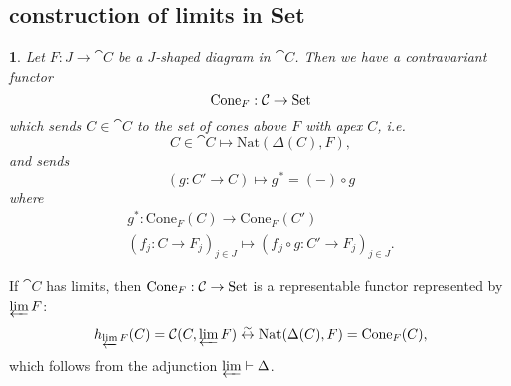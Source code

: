 \documentclass[12pt]{article}
\newtheorem{para}[theorem]{}
\begin{document}
\subsection{construction of limits in Set} %

\begin{para}
	Let $F:J\to\cat{C}$ be a $J$-shaped diagram in $\cat{C}$. Then we have a contravariant functor
	\begin{equation*}
		\text{Cone}_F:\mathcal{C}\to\text{Set}
	\end{equation*}
	which sends $C\in\cat{C}$ to the set of cones above $F$ with apex $C$, i.e.  
	\begin{equation*}
		C\in\cat{C} \mapsto \text{Nat}(\Delta(C), F),
	\end{equation*}
	and sends 
	\begin{equation*}
		(g: C'\to C) \mapsto g^\ast = (-) \circ g
	\end{equation*}
	where 
	\begin{gather*}
		g^\ast: \text{Cone}_F(C) \to \text{Cone}_F(C') \\
		(f_j: C\to F_j)_{j\in J} \mapsto (f_j\circ g: C' \to F_j)_{j\in J}.
	\end{gather*}
\end{para}

\begin{corollary}
	If $\cat{C}$ has limits, then $\text{Cone}_F:\mathcal{C}\to\text{Set}$ is a representable functor represented by $\varprojlim F$:
	\begin{equation*}
		h_{\varprojlim F}(C) = \mathcal{C}(C, \varprojlim F) \overset{\sim}{\leftrightarrow} \text{Nat}(\Delta(C), F) = \text{Cone}_F(C),
	\end{equation*}
	which follows from the adjunction $\varprojlim\vdash\Delta$.
\end{corollary}
\end{document}
